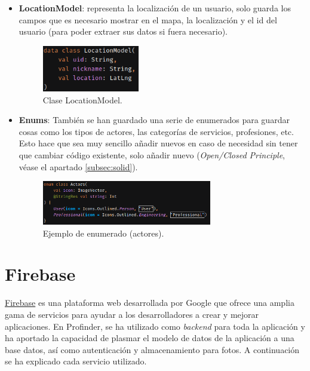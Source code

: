 \begin{itemize}
    \item \textbf{LocationModel}: representa la localización de un usuario, solo guarda los campos que es necesario mostrar en el mapa, la localización y el id del usuario (para poder extraer sus datos si fuera necesario).
    \begin{figure}[h]
        \centering
        \includegraphics[width = 0.4\textwidth]{Imagenes/Fuentes/LocationModel.png}
        \caption{Clase LocationModel.}
        \label{fig:LocationModel}
    \end{figure}
    \item \textbf{Enums}: También se han guardado una serie de enumerados para guardar cosas como los tipos de actores, las categorías de servicios, profesiones, etc. Esto hace que sea muy sencillo añadir nuevos en caso de necesidad sin tener que cambiar código existente, solo añadir nuevo (\textit{Open/Closed Principle}, véase el apartado \ref{subsec:solid}).
    \begin{figure}[h]
        \centering
        \includegraphics[width = 0.7\textwidth]{Imagenes/Fuentes/ejemplo_enum.png}
        \caption{Ejemplo de enumerado (actores).}
        \label{fig:ejemplo_enum}
    \end{figure}
\end{itemize}

\hypertarget{subsec:firebase}{}
\section{Firebase} 
\href{https://firebase.google.com/}{Firebase} es una plataforma web desarrollada por Google que ofrece una amplia gama de servicios para ayudar a los desarrolladores a crear y mejorar aplicaciones. En Profinder, se ha utilizado como \textit{backend} para toda la aplicación y ha aportado la capacidad de plasmar el modelo de datos de la aplicación a una base datos, así como autenticación y almacenamiento para fotos. A continuación se ha explicado cada servicio utilizado.
